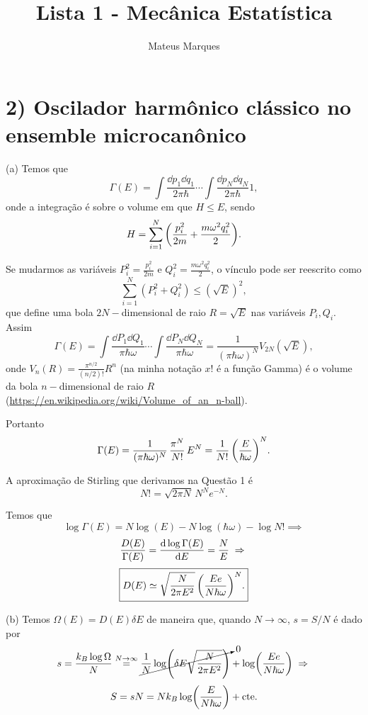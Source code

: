 \documentclass[a4paper,10pt]{article}
\title{\Huge{\textbf{Lista 1 - Mecânica Estatística}}}
\author{Mateus Marques}
\begin{document}
\maketitle

\section*{2) Oscilador harmônico clássico no ensemble microcanônico}

(a) Temos que
$$
\Gamma(E) = \int \frac{\dd{p_1} \dd{q_1}}{2\pi\hbar} \cdots \int \frac{\dd{p_N} \dd{q_N}}{2\pi\hbar} 1,
$$
onde a integração é sobre o volume em que $H \leq E$, sendo
$$
H = \sum_{i=1}^{N}
\qty(
\frac{p_i^2}{2m} + \frac{m\omega^2 q_i^2}{2}
).
$$

Se mudarmos as variáveis $P_i^2 = \frac{p_i^2}{2m}$ e $Q_i^2 = \frac{m \omega^2 q_i^2}{2}$, o vínculo pode ser reescrito como
$$
\sum_{i=1}^{N} (P_i^2 + Q_i^2) \leq (\sqrt{E})^2,
$$
que define uma bola $2N-$dimensional de raio $R = \sqrt{E}$ nas variáveis $P_i, Q_i$. Assim
$$
\Gamma(E) = \int \frac{\dd{P_1} \dd{Q_1}}{\pi\hbar \omega} \cdots \int \frac{\dd{P_N} \dd{Q_N}}{\pi\hbar \omega} =
\frac{1}{(\pi \hbar \omega)^N} V_{2N}(\sqrt{E}),
$$
onde $V_n(R) = \frac{\pi^{n/2}}{(n/2)!} R^n$ (na minha notação $x!$ é a função Gamma) é o volume da bola $n-$dimensional de raio $R$ (\url{https://en.wikipedia.org/wiki/Volume_of_an_n-ball}).

Portanto
$$
\Gamma(E) =
\frac{1}{(\pi \hbar \omega)^N} \, \frac{\pi^N}{N!} \, E^N = \frac{1}{N!} \, \qty(\frac{E}{\hbar\omega})^N.
$$

A aproximação de Stirling que derivamos na Questão 1 é
$$
N! = \sqrt{2\pi N} \, N^N e^{-N}.
$$

Temos que
$$
\log \Gamma(E) = N \log(E) - N \log(\hbar\omega) - \log N! \implies
$$
$$
\frac{D(E)}{\Gamma(E)} = \dv{\log \Gamma(E)}{E} = \frac{N}{E} \implies
$$
$$
\boxed{ D(E) \simeq \sqrt{\frac{N}{2\pi E^2}} \, \qty(\frac{E e}{N \hbar\omega})^N .}
$$

\n\n

(b) Temos $\Omega(E) = D(E) \delta E$ de maneira que, quando $N \to \infty$, $s = S/N$ é dado por
$$
s = \frac{k_B \log \Omega}{N} \stackrel{N \to \infty}{=}
\cancelto{0}{\frac{1}{N} \log(\delta E \sqrt{\frac{N}{2\pi E^2}})} + \log(\frac{Ee}{N\hbar \omega}) \implies
$$
$$
S = s N = N k_B \log(\frac{E}{N \hbar \omega}) + \cte.
$$
\end{document}
